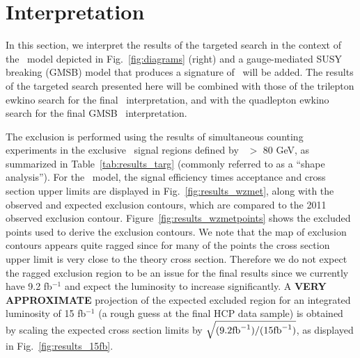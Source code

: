 \section{Interpretation}

In this section, we interpret the results of the targeted search in the context of the \wzmet\ model depicted in Fig.~\ref{fig:diagrams} (right)
and a gauge-mediated SUSY breaking (GMSB) model that produces a signature of \zzmet\ will be added. The results of the targeted search presented here
will be combined with those of the trilepton ewkino search for the final \wzmet\ interpretation, and with the quadlepton ewkino search
for the final GMSB \zzmet\ interpretation.

The exclusion is performed using the results of simultaneous counting experiments in the exclusive \MET\ signal regions defined by \MET\ $>$ 80 GeV,
as summarized in Table~\ref{tab:results_targ} (commonly referred to as a ``shape analysis''). 
For the \wzmet\ model, the signal efficiency times acceptance and cross section upper limits are displayed in Fig.~\ref{fig:results_wzmet},
along with the observed and expected exclusion contours, which are compared to the 2011 observed exclusion contour.
Figure~\ref{fig:results_wzmetpoints} shows the excluded points used to derive the exclusion contours. We note that the map of exclusion
contours appears quite ragged since for many of the points the cross section upper limit is very close to the theory cross section.
Therefore we do not expect the ragged exclusion region to be an issue for the final results since
we currently have 9.2 fb$^{-1}$ and expect the luminosity to increase significantly. A {\bf VERY APPROXIMATE} projection of the expected excluded region
for an integrated luminosity of 15 fb$^{-1}$ (a rough guess at the final HCP data sample) is obtained by scaling the expected cross section limits by 
$\sqrt{(9.2 \rm{fb}^{-1})/(15 \rm{fb}^{-1})}$, as displayed in Fig.~\ref{fig:results_15fb}.

